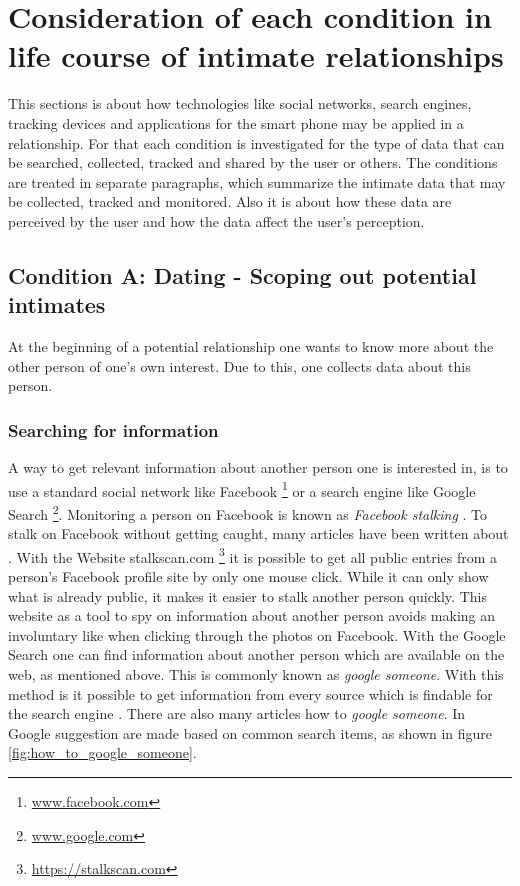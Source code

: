 \section{Consideration of each condition in life course of intimate relationships}
\label{sec:consideration_life_course_conditions}
This sections is about how technologies like social networks, search engines, tracking devices and applications for the smart phone may be applied in a relationship.
For that each condition is investigated for the type of data that can be searched, collected, tracked and shared by the user or others.
The conditions are treated in separate paragraphs, which summarize the intimate data that may be collected, tracked and monitored. Also it is about how these data are perceived by the user and how the data affect the user's perception.

\subsection{Condition A: Dating - Scoping out potential intimates}
\label{subsec:A}
At the beginning of a potential relationship one wants to know more about the other person of one's own interest. Due to this, one collects data about this person. 
\subsubsection{Searching for information}
A way to get relevant information about another person one is interested in, is to use a standard social network like Facebook \footnote{\url{www.facebook.com}} or a search engine like Google Search \footnote{\url{www.google.com}}.
Monitoring a person on Facebook is known as \textit{Facebook stalking} \cite{levy2014intimate}. To stalk on Facebook without getting caught, many articles have been written about \cite{sueddeutsche_fb_stalking}. With the Website stalkscan.com \footnote{\url{https://stalkscan.com}} it is possible to get all public entries from a person's Facebook profile site by only one mouse click. While it can only show what is already public, it makes it easier to stalk another person quickly.
This website as a tool to spy on information about another person avoids making an involuntary like when clicking through the photos on Facebook.
With the Google Search one can find information about another person which are available on the web, as mentioned above. This is commonly known as \textit{google someone}. With this method is it possible to get information from every source which is findable for the search engine \cite{nolan2005hacking}. There are also many articles how to \textit{google someone}. In Google suggestion are made based on common search items, as shown in figure \ref{fig:how_to_google_someone}.

